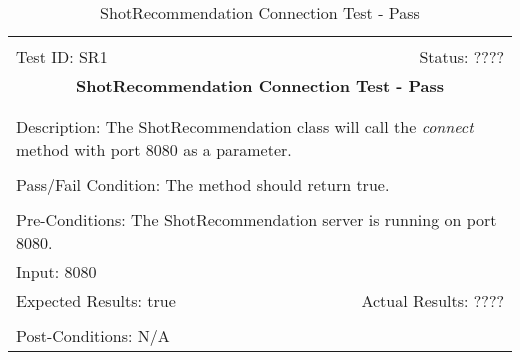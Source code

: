 \documentclass[11pt]{article}
\begin{document}
\begin{center}
\begin{table}[H]
\begin{tabular}{|l r|}\hline&\\[-2mm]
	Test ID: SR1	&Status: ????\\[-3mm]
	\multicolumn{2}{|c|}{\textbf{\large{ShotRecommendation Connection Test - Pass}}}\\&\\\hline&\\[-3mm]
	\multicolumn{2}{|p{\textwidth}|}{Description: The ShotRecommendation class will call the \textit{connect} method with port 8080 as a parameter.}\\[1mm]\hline&\\[-3mm]
	\multicolumn{2}{|p{\textwidth}|}{Pass/Fail Condition: The method should return true.}\\[1mm]\hline&\\[-3mm]
	\multicolumn{2}{|p{\textwidth}|}{Pre-Conditions: The ShotRecommendation server is running on port 8080.}\\[4mm]
	\multicolumn{2}{|p{\textwidth}|}{Input: 8080}\\[2mm]\hline
	\multicolumn{1}{|p{0.49\textwidth}}{Expected Results: true}	&\multicolumn{1}{|p{0.45\textwidth}|}{Actual Results: ????}\\\hline&\\[-3mm]
	\multicolumn{2}{|p{\textwidth}|}{Post-Conditions: N/A}\\\hline
\end{tabular}
\caption{ShotRecommendation Connection Test - Pass}
\end{table}
\end{center}
\end{document}
